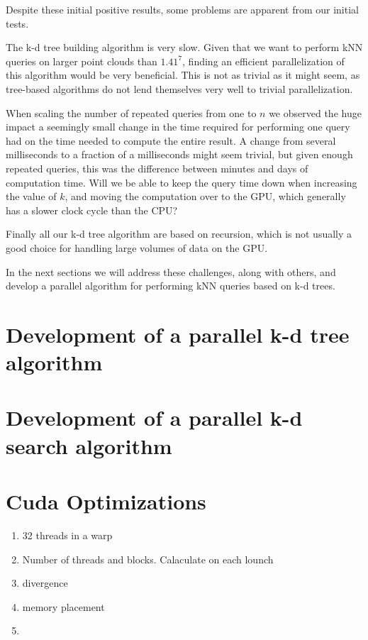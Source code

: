 Despite these initial positive results, some problems are apparent from our initial tests.

The k-d tree building algorithm is very slow. Given that we want to perform kNN queries on larger point clouds than $1.41^7$, finding an efficient parallelization of this algorithm would be very beneficial. This is not as trivial as it might seem, as tree-based algorithms do not lend themselves very well to trivial parallelization.

When scaling the number of repeated queries from one to $n$ we observed the huge impact a seemingly small change in the time required for performing one query had on the time needed to compute the entire result. A change from several milliseconds to a fraction of a milliseconds might seem trivial, but given enough repeated queries, this was the difference between minutes and days of computation time. Will we be able to keep the query time down when increasing the value of $k$, and moving the computation over to the GPU, which generally has a slower clock cycle than the CPU?

Finally all our k-d tree algorithm are based on recursion, which is not usually a good choice for handling large volumes of data on the GPU.

In the next sections we will address these challenges, along with others, and develop a parallel algorithm for performing kNN queries based on k-d trees.

\section{Development of a parallel k-d tree algorithm} %
\label{sec:development_of_a_parallel_k_d_tree_algorithm}



\section{Development of a parallel k-d search algorithm} %
\label{sec:development_of_a_parallel_k_d_search_algorithm}




\section*{Cuda Optimizations}

\begin{enumerate}
\item 32 threads in a warp
\item Number of threads and blocks. Calaculate on each lounch
\item divergence
\item memory placement
\item
\end{enumerate}

\cleardoublepage
